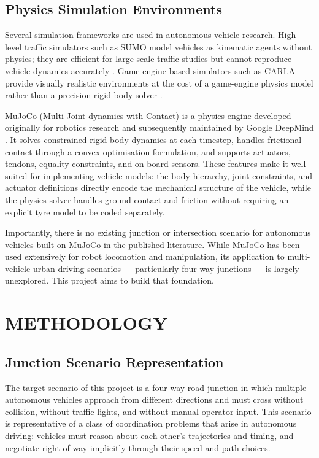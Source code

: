 \documentclass[a4paper,12pt]{report}
\begin{document}
\section{Physics Simulation Environments}

Several simulation frameworks are used in autonomous vehicle research. High-level
traffic simulators such as SUMO model vehicles as kinematic agents without
physics; they are efficient for large-scale traffic studies but cannot
reproduce vehicle dynamics accurately \cite{sumo}. Game-engine-based simulators
such as CARLA provide visually realistic environments at the cost of a game-engine
physics model rather than a precision rigid-body solver \cite{carla}.

MuJoCo (Multi-Joint dynamics with Contact) is a physics engine developed
originally for robotics research and subsequently maintained by Google
DeepMind \cite{mujoco}. It solves constrained rigid-body dynamics at each
timestep, handles frictional contact through a convex optimisation formulation,
and supports actuators, tendons, equality constraints, and on-board sensors.
These features make it well suited for implementing vehicle models: the body
hierarchy, joint constraints, and actuator definitions directly encode the
mechanical structure of the vehicle, while the physics solver handles ground
contact and friction without requiring an explicit tyre model to be coded
separately.

Importantly, there is no existing junction or intersection scenario for
autonomous vehicles built on MuJoCo in the published literature. While MuJoCo
has been used extensively for robot locomotion and manipulation, its application
to multi-vehicle urban driving scenarios — particularly four-way junctions — is
largely unexplored. This project aims to build that foundation.

\chapter{METHODOLOGY}

\section{Junction Scenario Representation}

The target scenario of this project is a four-way road junction in which
multiple autonomous vehicles approach from different directions and must cross
without collision, without traffic lights, and without manual operator input.
This scenario is representative of a class of coordination problems that arise
in autonomous driving: vehicles must reason about each other's trajectories and
timing, and negotiate right-of-way implicitly through their speed and path
choices.
\end{document}
